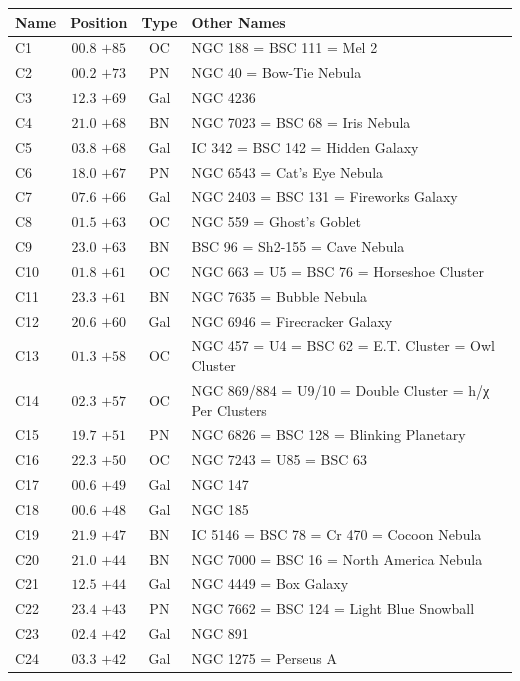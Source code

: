 
\begin{table}[t]
    \setlength{\tabcolsep}{2pt}
    \footnotesize
    \begin{tabularx}{\linewidth}{lccX}
        \hline
        Name&Position&Type&Other Names\\
        \hline

C1   &$00.8$ $+85$&OC &NGC 188 = BSC 111 = Mel 2\\
C2   &$00.2$ $+73$&PN &NGC 40 = Bow-Tie Nebula\\
C3   &$12.3$ $+69$&Gal&NGC 4236\\
C4   &$21.0$ $+68$&BN &NGC 7023 = BSC 68 = Iris Nebula\\
C5   &$03.8$ $+68$&Gal&IC 342 = BSC 142 = Hidden Galaxy\\
C6   &$18.0$ $+67$&PN &NGC 6543 = Cat's Eye Nebula\\
C7   &$07.6$ $+66$&Gal&NGC 2403 = BSC 131 = Fireworks Galaxy\\
C8   &$01.5$ $+63$&OC &NGC 559 = Ghost's Goblet\\
C9   &$23.0$ $+63$&BN &BSC 96 = Sh2-155 = Cave Nebula\\
C10  &$01.8$ $+61$&OC &NGC 663 = U5 = BSC 76 = Horseshoe Cluster\\
C11  &$23.3$ $+61$&BN &NGC 7635 = Bubble Nebula\\
C12  &$20.6$ $+60$&Gal&NGC 6946 = Firecracker Galaxy\\
C13  &$01.3$ $+58$&OC &NGC 457 = U4 = BSC 62 = E.T. Cluster = Owl Cluster\\
C14  &$02.3$ $+57$&OC &NGC 869/884 = U9/10 = Double Cluster = h/χ Per Clusters\\
C15  &$19.7$ $+51$&PN &NGC 6826 = BSC 128 = Blinking Planetary\\
C16  &$22.3$ $+50$&OC &NGC 7243 = U85 = BSC 63\\
C17  &$00.6$ $+49$&Gal&NGC 147\\
C18  &$00.6$ $+48$&Gal&NGC 185\\
C19  &$21.9$ $+47$&BN &IC 5146 = BSC 78 = Cr 470 = Cocoon Nebula\\
C20  &$21.0$ $+44$&BN &NGC 7000 = BSC 16 = North America Nebula\\
C21  &$12.5$ $+44$&Gal&NGC 4449 = Box Galaxy\\
C22  &$23.4$ $+43$&PN &NGC 7662 = BSC 124 = Light Blue Snowball\\
C23  &$02.4$ $+42$&Gal&NGC 891\\
C24  &$03.3$ $+42$&Gal&NGC 1275 = Perseus A\\

\end{tabularx}
\end{table}
